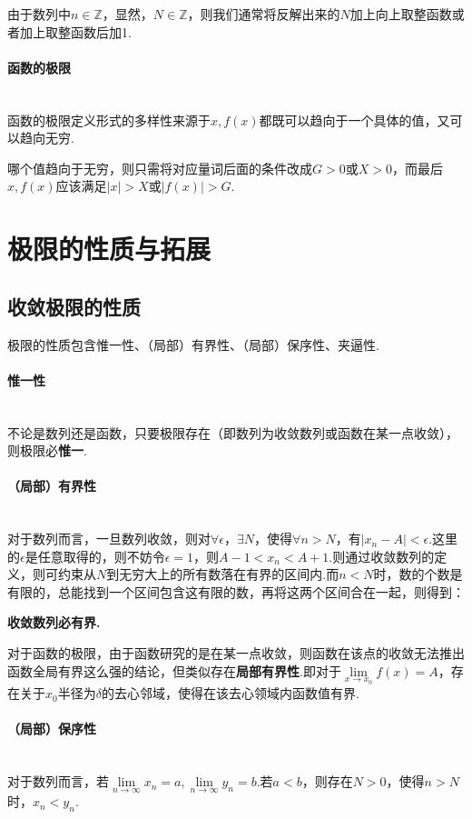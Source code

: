 \documentclass{ctexbook}
\begin{document}
	由于数列中$n\in \mathbb{Z}$，显然，$N\in \mathbb{Z}$，则我们通常将反解出来的$N$加上向上取整函数或者加上取整函数后加1.
	
	\paragraph{函数的极限}~{}
	\\
	\indent
	函数的极限定义形式的多样性来源于$x,f(x)$都既可以趋向于一个具体的值，又可以趋向无穷.
	
	哪个值趋向于无穷，则只需将对应量词后面的条件改成$G>0$或$X>0$，而最后$x,f(x)$应该满足$|x|>X$或$|f(x)|>G$.
	
	
	\section{极限的性质与拓展}
	\subsection{收敛极限的性质}
	极限的性质包含惟一性、（局部）有界性、（局部）保序性、夹逼性.
	\paragraph{惟一性}~{}
	\\
	\indent
	不论是数列还是函数，只要极限存在（即数列为收敛数列或函数在某一点收敛），则极限必\textbf{惟一}.
	
	\paragraph{（局部）有界性}~{}
	\\
	\indent
	对于数列而言，一旦数列收敛，则对$\forall \epsilon$，$\exists N$，使得$\forall n>N$，有$|x_n-A|<\epsilon$.这里的$\epsilon$是任意取得的，则不妨令$\epsilon=1$，则$A-1<x_n<A+1$.则通过收敛数列的定义，则可约束从$N$到无穷大上的所有数落在有界的区间内.而$n<N$时，数的个数是有限的，总能找到一个区间包含这有限的数，再将这两个区间合在一起，则得到：
	
	\centerline{\textbf{收敛数列必有界.}}
	
	对于函数的极限，由于函数研究的是在某一点收敛，则函数在该点的收敛无法推出函数全局有界这么强的结论，但类似存在\textbf{局部有界性}.即对于$\lim\limits_{x \to x_0}f(x)=A$，存在关于$x_0$半径为$\delta$的去心邻域，使得在该去心领域内函数值有界.
	
	\paragraph{（局部）保序性}~{}
	\\
	\indent
	对于数列而言，若$\lim\limits_{n \to \infty}x_n=a,\lim\limits_{n \to \infty}y_n=b$.若$a<b$，则存在$N>0$，使得$n>N$时，$x_n<y_n$.
	
\end{document}
